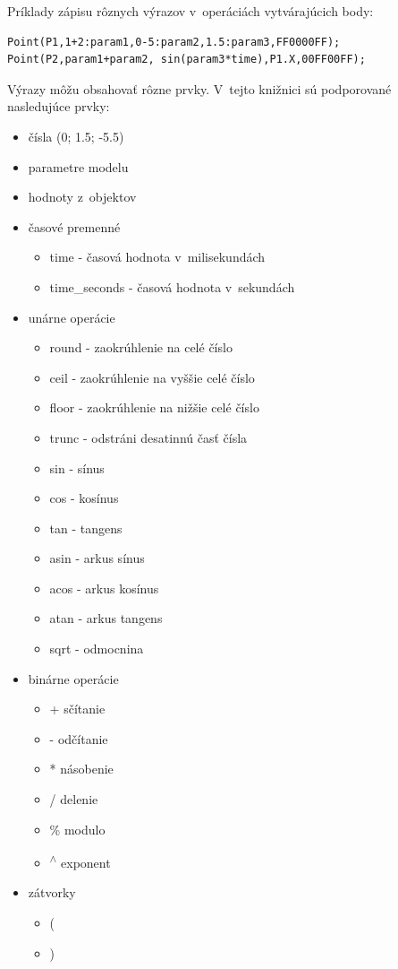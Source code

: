 Príklady zápisu rôznych výrazov v~operáciách vytvárajúcich body:\nopagebreak
\lstset {language=C++}
\begin{lstlisting}
Point(P1,1+2:param1,0-5:param2,1.5:param3,FF0000FF);
Point(P2,param1+param2, sin(param3*time),P1.X,00FF00FF); 
\end{lstlisting}

Výrazy môžu obsahovať rôzne prvky. V~tejto knižnici sú podporované nasledujúce prvky: 
\begin{itemize}
    \item  čísla (0; 1.5; -5.5)
    \item  parametre modelu
    \item  hodnoty z~objektov
    \item  časové premenné
        \begin{itemize}
            \item  time - časová hodnota v~milisekundách
            \item  time\_seconds - časová hodnota v~sekundách
         \end{itemize}
    \item  unárne operácie
        \begin{itemize}
            \item  round - zaokrúhlenie na celé číslo
            \item  ceil - zaokrúhlenie na vyššie celé číslo
            \item  floor  - zaokrúhlenie na nižšie celé číslo
            \item  trunc  - odstráni desatinnú časť čísla
            \item  sin - sínus
            \item  cos - kosínus
            \item  tan - tangens
            \item  asin - arkus sínus 
            \item  acos - arkus kosínus
            \item  atan - arkus tangens
            \item  sqrt - odmocnina
         \end{itemize}
    \item  binárne operácie
        \begin{itemize}
            \item + sčítanie
            \item - odčítanie
            \item * násobenie
            \item / delenie
            \item \% modulo
            \item \textsuperscript{$\wedge$} exponent
         \end{itemize}
    \item  zátvorky
        \begin{itemize}
            \item  (
            \item  )
         \end{itemize}
 \end{itemize}
 


